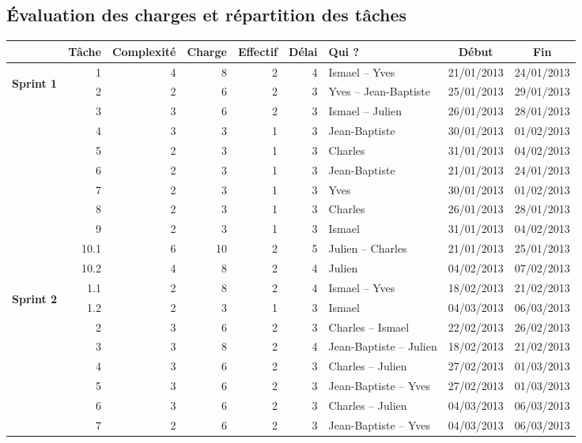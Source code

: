 \documentclass[a4paper,11pt,french]{article}
\begin{document}
\subsection{Évaluation des charges et répartition des tâches}
\begin{landscape}
\begin{tabularx}{20cm}{|c|r|r|r|r|r|X|c|c|}
\hline
&\textbf{Tâche} & \textbf{Complexité} & \textbf{Charge} & \textbf{Effectif} & \textbf{Délai} & \textbf{Qui ?} & \textbf{Début} & \textbf{Fin}\\

\hline
\multirow{11}{*}{\begin{sideways}\textbf{Sprint 1}\end{sideways}}& 1&4 &8 &2 &4 & Ismael -- Yves & 21/01/2013 & 24/01/2013\\
\cline{2-9}
& 2& 2& 6& 2& 3& Yves -- Jean-Baptiste& 25/01/2013 & 29/01/2013\\
\cline{2-9}
& 3& 3& 6& 2& 3& Ismael -- Julien& 26/01/2013& 28/01/2013\\
\cline{2-9}
& 4& 3& 3& 1& 3& Jean-Baptiste& 30/01/2013& 01/02/2013\\
\cline{2-9}
& 5& 2& 3& 1& 3& Charles& 31/01/2013& 04/02/2013\\
\cline{2-9}
& 6& 2& 3& 1& 3& Jean-Baptiste& 21/01/2013& 24/01/2013\\
\cline{2-9}
& 7& 2& 3& 1& 3& Yves& 30/01/2013& 01/02/2013\\
\cline{2-9}
& 8& 2& 3& 1& 3& Charles& 26/01/2013& 28/01/2013\\
\cline{2-9}
& 9& 2& 3& 1& 3& Ismael& 31/01/2013& 04/02/2013\\
\cline{2-9}
& 10.1& 6& 10& 2& 5&Julien -- Charles& 21/01/2013& 25/01/2013\\
\cline{2-9}
& 10.2& 4& 8& 2& 4& Julien& 04/02/2013& 07/02/2013\\

\hline
\multirow{8}{*}{\begin{sideways}\textbf{Sprint 2}\end{sideways}}& 1.1& 2& 8& 2& 4& Ismael -- Yves& 18/02/2013& 21/02/2013\\
\cline{2-9}
& 1.2& 2& 3& 1& 3& Ismael & 04/03/2013& 06/03/2013\\
\cline{2-9}
& 2& 3& 6& 2& 3& Charles -- Ismael& 22/02/2013& 26/02/2013\\
\cline{2-9}
& 3& 3& 8& 2& 4& Jean-Baptiste -- Julien& 18/02/2013& 21/02/2013\\
\cline{2-9}
& 4& 3& 6& 2& 3& Charles -- Julien& 27/02/2013&01/03/2013\\
\cline{2-9}
& 5& 3& 6& 2& 3& Jean-Baptiste -- Yves& 27/02/2013&01/03/2013\\
\cline{2-9}
& 6& 3& 6& 2& 3& Charles -- Julien& 04/03/2013&06/03/2013\\
\cline{2-9}
& 7& 2& 6& 2& 3& Jean-Baptiste -- Yves& 04/03/2013&06/03/2013\\


\end{tabularx}
\end{landscape}
\end{document}

